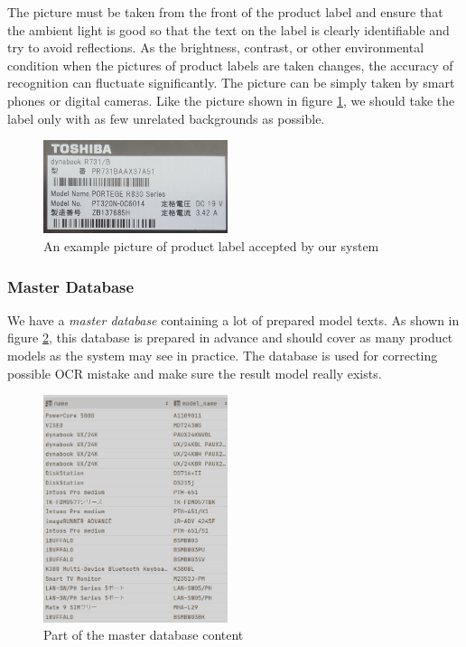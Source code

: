 \documentclass[technicalreport]{ieicej}
\begin{document}
            The picture must be taken from the front of the product label and ensure that the ambient light is good so that the text on the label is clearly identifiable and try to avoid reflections. As the brightness, contrast, or other environmental condition when the pictures of product labels are taken changes, the accuracy of recognition can fluctuate significantly. The picture can be simply taken by smart phones or digital cameras. Like the picture shown in figure \ref{fig:label-exp}, we should take the label only with as few unrelated backgrounds as possible.

            \begin{figure}[t] 
                \begin{center}
                \includegraphics[width=0.48\textwidth]{figure/label-exp.png}
                \end{center}
                \caption{An example picture of product label accepted by our system}
                \label{fig:label-exp}
            \end{figure}


        \subsubsection{Master Database}
            We have a {\em master database} containing a lot of prepared model texts. As shown in figure \ref{fig:db-sample}, this database is prepared in advance and should cover as many product models as the system may see in practice. The database is used for correcting possible OCR mistake and make sure the result model really exists. 

            \begin{figure}[t] 
                \begin{center}
                \includegraphics[width=0.48\textwidth]{figure/db-sample.png}
                \end{center}
                \caption{Part of the master database content}
                \label{fig:db-sample}
            \end{figure}
\end{document}
